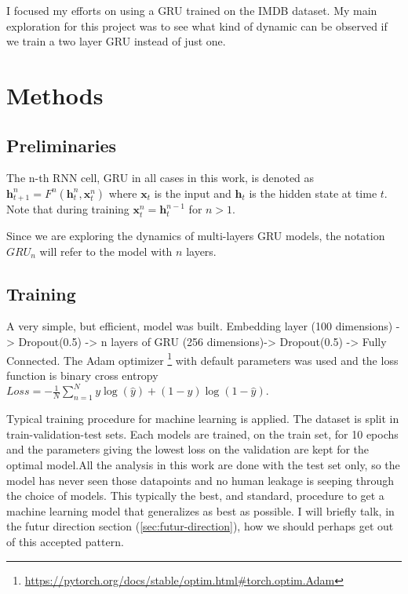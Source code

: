 \documentclass{article}
\begin{document}
I focused my efforts on using a GRU trained on the IMDB dataset. My main exploration for this project was to see what kind of dynamic can be observed if we train a two layer GRU instead of just one.

\section{Methods}

\subsection{Preliminaries}
\label{sec:method-preliminaries}
The n-th RNN cell, GRU in all cases in this work, is denoted as $\textbf{h}_{t+1}^{n}=F^{n}(\textbf{h}_t^{n}, \textbf{x}_t^{n})$ where $\textbf{x}_t$ is the input and  $\textbf{h}_t$ is the hidden state at time $t$. Note that during training $\textbf{x}_t^{n} = \textbf{h}_t^{n-1}$ for  $n > 1$. 

Since we are exploring the dynamics of multi-layers GRU models, the notation $GRU_n$ will refer to the model with $n$ layers.

\subsection{Training}
A very simple, but efficient, model was built. Embedding layer (100 dimensions) -> Dropout(0.5) -> n layers of GRU (256 dimensions)-> Dropout(0.5) -> Fully Connected. The Adam optimizer \footnote{\url{https://pytorch.org/docs/stable/optim.html\#torch.optim.Adam}} with default parameters was used and the loss function is binary cross entropy $Loss=-\frac{1}{N}\sum_{n=1}^{N} y\log\left( \hat{y} \right) + \left( 1-y \right) \log\left( 1-\hat{y} \right)$.

Typical training procedure for machine learning is applied. The dataset is split in train-validation-test sets. Each models are trained, on the train set, for 10 epochs and the parameters giving the lowest loss on the validation are kept for the optimal model.All the analysis in this work are done with the test set only, so the model has never seen those datapoints and no human leakage is seeping through the choice of models. This typically the best, and standard, procedure to get a machine learning model that generalizes as best as possible. I will briefly talk, in the futur direction section (\ref{sec:futur-direction}), how we should perhaps get out of this accepted pattern.
\end{document}
